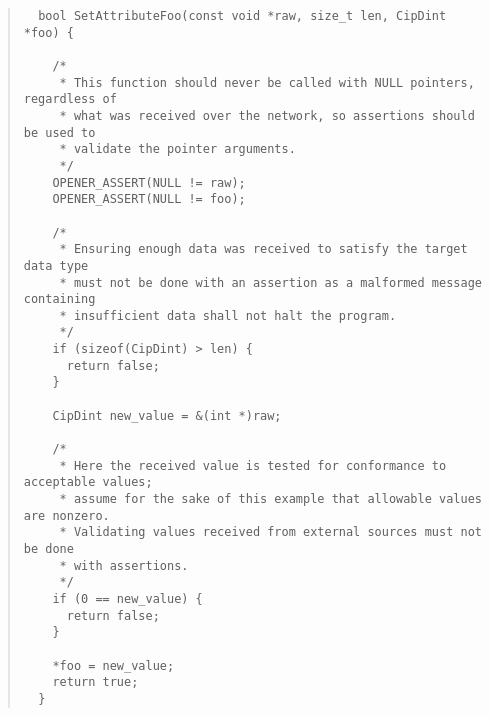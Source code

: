 \documentclass[final,a4paper,10pt, oneside]{article}
\begin{document}
\begin{quote}
\begin{lstlisting}
  bool SetAttributeFoo(const void *raw, size_t len, CipDint *foo) {

    /*
     * This function should never be called with NULL pointers, regardless of
     * what was received over the network, so assertions should be used to
     * validate the pointer arguments.
     */
    OPENER_ASSERT(NULL != raw);
    OPENER_ASSERT(NULL != foo);

    /*
     * Ensuring enough data was received to satisfy the target data type
     * must not be done with an assertion as a malformed message containing
     * insufficient data shall not halt the program.
     */
    if (sizeof(CipDint) > len) {
      return false;
    }

    CipDint new_value = &(int *)raw;

    /*
     * Here the received value is tested for conformance to acceptable values;
     * assume for the sake of this example that allowable values are nonzero.
     * Validating values received from external sources must not be done
     * with assertions.
     */
    if (0 == new_value) {
      return false;
    }

    *foo = new_value;
    return true;
  }
\end{lstlisting}
\end{quote}
\end{document}

